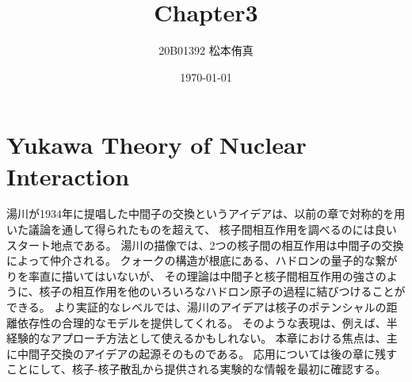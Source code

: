 \documentclass[a4paper,11pt,uplatex]{jsarticle}
\title{Chapter3}
\author{20B01392 松本侑真}
\date{\today}
\begin{document}
\maketitle
\begin{abstract}

\end{abstract}
\tableofcontents
\newpage

\setcounter{section}{5}
\section{Yukawa Theory of Nuclear Interaction}
湯川が1934年に提唱した中間子の交換というアイデアは、以前の章で対称的を用いた議論を通して得られたものを超えて、
核子間相互作用を調べるのには良いスタート地点である。
湯川の描像では、2つの核子間の相互作用は中間子の交換によって仲介される。
クォークの構造が根底にある、ハドロンの量子的な繋がりを率直に描いてはいないが、
その理論は中間子と核子間相互作用の強さのように、核子の相互作用を他のいろいろなハドロン原子の過程に結びつけることができる。
より実証的なレベルでは、湯川のアイデアは核子のポテンシャルの距離依存性の合理的なモデルを提供してくれる。
そのような表現は、例えば、半経験的なアプローチ方法として使えるかもしれない。
本章における焦点は、主に中間子交換のアイデアの起源そのものである。
応用については後の章に残すことにして、核子-核子散乱から提供される実験的な情報を最初に確認する。
\end{document}
